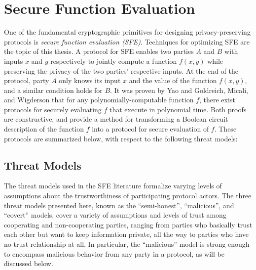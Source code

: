 \section{Secure Function Evaluation}

One of the fundamental cryptographic primitives for designing privacy-preserving
protocols is \textit{secure function evaluation (SFE)}. Techniques
for optimizing SFE are the topic of this thesis. A protocol for SFE
enables two parties $A$ and $B$ with inputs $x$ and $y$ respectively
to jointly compute a function $f(x,y)$ while preserving the privacy
of the two parties' respective inputs. At the end of the protocol,
party $A$ only knows its input $x$ and the value of the function
$f(x,y)$, and a similar condition holds for $B$. It was proven by
Yao \cite{Yao86} and Goldreich, Micali, and Wigderson \cite{GMW87}
that for any polynomially-computable function $f$, there exist protocols
for securely evaluating $f$ that execute in polynomial time. Both
proofs are constructive, and provide a method for transforming a Boolean
circuit description of the function $f$ into a protocol for secure
evaluation of $f$. These protocols are summarized below, with respect
to the following threat models:

\subsection{Threat Models\label{sub:Threat-Models}}

The threat models used in the SFE literature
formalize varying levels of assumptions about the trustworthiness
of participating protocol actors.  The three threat models
presented here, known as the {}``semi-honest'', {}``malicious'',
and {}``covert'' models, cover a variety of assumptions and levels
of trust among cooperating and non-cooperating parties, ranging from
parties who basically trust each other but want to keep information
private, all the way to parties who have no trust relationship at
all. In particular, the {}``malicious'' model is strong enough to
encompass malicious behavior from any party in a protocol, as will
be discussed below.

